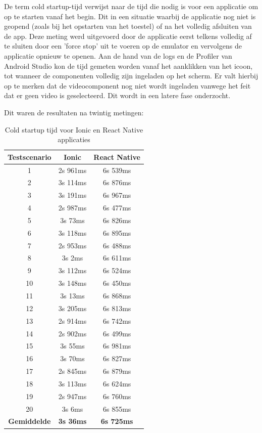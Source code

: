 De term cold startup-tijd verwijst naar de tijd die nodig is voor een applicatie om op te starten vanaf het begin. Dit in een situatie waarbij de applicatie nog niet is geopend (zoals bij het opstarten van het toestel) of na het volledig afsluiten van de app. Deze meting werd uitgevoerd door de applicatie eerst telkens volledig af te sluiten door een 'force stop' uit te voeren op de emulator en vervolgens de applicatie opnieuw te openen. Aan de hand van de logs en de Profiler van Android Studio kon de tijd gemeten worden vanaf het aanklikken van het icoon, tot wanneer de componenten volledig zijn ingeladen op het scherm. Er valt hierbij op te merken dat de videocomponent nog niet wordt ingeladen vanwege het feit dat er geen video is geselecteerd. Dit wordt in een latere fase onderzocht.

Dit waren de resultaten na twintig metingen:

\begin{table}[htbp]
  \centering
  \begin{tabular}{|c|c|c|}
    \hline
    \textbf{Testscenario} & \textbf{Ionic} & \textbf{React Native} \\
    \hline
    1 & 2s 961ms & 6s 539ms \\
    \hline
    2 & 3s 114ms & 6s 876ms \\
    \hline
    3 & 3s 191ms & 6s 967ms \\
    \hline
    4 & 2s 987ms & 6s 477ms \\
    \hline
    5 & 3s 73ms & 6s 826ms \\
    \hline
    6 & 3s 118ms & 6s 895ms \\
    \hline
    7 & 2s 953ms & 6s 488ms \\
    \hline
    8 & 3s 2ms & 6s 611ms \\
    \hline
    9 & 3s 112ms & 6s 524ms \\
    \hline
    10 & 3s 148ms & 6s 450ms \\
    \hline
    11 & 3s 13ms & 6s 868ms \\
    \hline
    12 & 3s 205ms & 6s 813ms \\
    \hline
    13 & 2s 914ms & 6s 742ms \\
    \hline
    14 & 2s 902ms & 6s 499ms \\
    \hline
    15 & 3s 55ms & 6s 981ms \\
    \hline
    16 & 3s 70ms & 6s 827ms \\
    \hline
    17 & 2s 845ms & 6s 879ms \\
    \hline
    18 & 3s 113ms & 6s 624ms \\
    \hline
    19 & 2s 947ms & 6s 760ms \\
    \hline
    20 & 3s 6ms & 6s 855ms \\
    \hline
    \textbf{Gemiddelde} & \textbf{3s 36ms} & \textbf{6s 725ms} \\
    \hline
  \end{tabular}
  \caption{Cold startup tijd voor Ionic en React Native applicaties}
  \label{tab:cold_startup}
\end{table}

